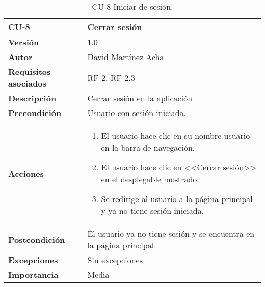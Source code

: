 \begin{table}[p]
	\centering
	\begin{tabularx}{\linewidth}{ p{} p{} }
		\toprule
		\textbf{CU-8}    & \textbf{Cerrar sesión}\\
		\toprule
		\textbf{Versión}              & 1.0    \\
		\textbf{Autor}                & David Martínez Acha \\
		\textbf{Requisitos asociados} & RF-2, RF-2.3 \\
		\textbf{Descripción}          & Cerrar sesión en la aplicación \\
		\textbf{Precondición}         & Usuario con sesión iniciada. \\
		\textbf{Acciones}             &
		\begin{enumerate}
			\def\labelenumi{\arabic{enumi}.}
			\tightlist
			\item El usuario hace clic en su nombre usuario en la barra de navegación.
			\item El usuario hace clic en <<Cerrar sesión>> en el desplegable mostrado.
			\item Se redirige al usuario a la página principal y ya no tiene sesión iniciada.
		\end{enumerate}\\
		\textbf{Postcondición}        & El usuario ya no tiene sesión y se encuentra en la página principal. \\
		\textbf{Excepciones}          & Sin excepciones \\
		\textbf{Importancia}          & Media \\
		\bottomrule
	\end{tabularx}
	\caption{CU-8 Iniciar de sesión.}
\end{table}


